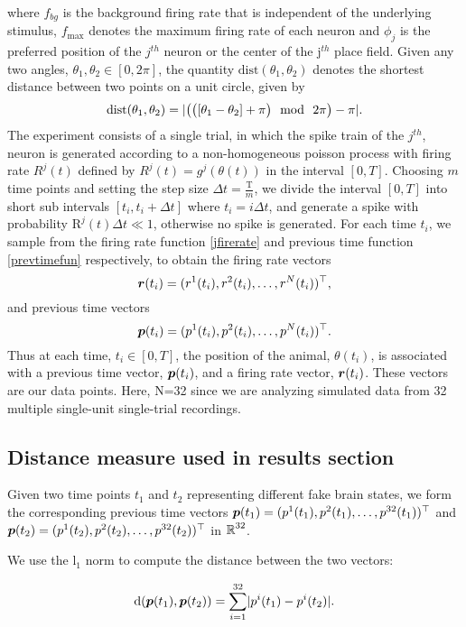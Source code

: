 where $f_{bg}$ is the background firing rate that is independent of the underlying stimulus, $f_{\max}$ denotes the maximum firing rate of each 
neuron and $\phi_{j}$ is the preferred position of the $j^{th}$ 
neuron or the center of the j$^{th}$ place field.
Given any two angles, $\theta_{1}, \theta_{2} \in [0, 2\pi]$, the quantity
$\text{dist}(\theta_{1}, \theta_{2})$ denotes the shortest distance between 
two points on a unit circle, given by
\[
\text{dist}(\theta_{1}, \theta_{2}) = \abs{\big( \big( [\theta_{1} - \theta_{2}] + \pi  \big) \ \ \text{mod} \ \ 2\pi \big) - \pi}.
\]
The experiment consists of a single trial, in which the spike train of the $j^{th}$, neuron is generated according to a non-homogeneous poisson process with firing rate $R^{j}(t)$ defined by $R^{j}(t) = g^{j}(\theta(t))$ in the interval $[0, T]$. Choosing $m$ time points and setting the step size $\Delta t = \frac{\text{T}}{m}$, we divide the interval $[0, T]$ into short sub
intervals $[t_{i}, t_{i} + \Delta t]$ where $t_{i} = i \Delta t$, and generate
a spike with probability $\text{R}^{j}(t)\Delta t \ll 1$, otherwise no spike is generated.
For each time $t_{i}$, we sample from  the firing rate function \eqref{jfirerate} and  previous time function \eqref{prevtimefun} respectively, to obtain the firing rate vectors 
\[ \boldsymbol{r}(t_{i}) = (r^{1}(t_{i}), r^{2}(t_{i}), \ldots, r^{N}(t_{i}))^{\top},
\]
and previous time vectors
\[
\boldsymbol{p}(t_{i}) = (p^{1}(t_{i}), p^{2}(t_{i}), \ldots, p^{N}(t_{i}))^{\top}.
\]
Thus at each time, $t_{i} \in [0,T]$, the position of the animal, $\theta(t_{i})$, is associated with a previous time vector, $\boldsymbol{p}(t_{i})$,
and a firing rate vector, $\boldsymbol{r}(t_{i})$.
These vectors are our data points.  Here, N=32 since we are analyzing simulated data from 32 multiple single-unit single-trial recordings.



\subsection{Distance measure used in results section}
Given two time points $t_{1}$ and $t_{2}$ representing different fake brain states, we form the corresponding previous time vectors $\boldsymbol{p}(t_{1})= (p^{1}(t_{1}), p^{2}(t_{1}), \ldots, p^{32}(t_{1}))^{\top} $  and  $\boldsymbol{p}(t_{2}) = (p^{1}(t_{2}), p^{2}(t_{2}), \ldots, p^{32}(t_{2}))^{\top}$ in $\operatorname{\mathbb{R}}^{32}$.

We use the l$_{1}$ norm to compute the distance between the two vectors:

\begin{equation}\label{distPrevtime}
\text{d}(\boldsymbol{p}(t_{1}), \boldsymbol{p}(t_{2}) ) = 
\displaystyle \sum_{i=1}^{32} \lvert p^{i}(t_{1}) - p^{i}(t_{2})   \rvert.
\end{equation}

